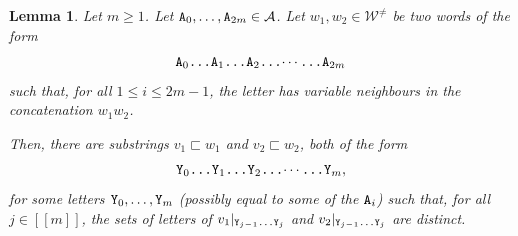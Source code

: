 \documentclass[11pt]{amsart}
\newtheorem{lemma}[theorem]{Lemma}
\theoremstyle{definition}
\renewcommand{\leq}{\leqslant}
\renewcommand{\geq}{\geqslant}
\newcommand{\sinterval}[1]{[\![#1]\!] }
\newcommand{\upletters}[1]{{\normalfont{\texttt{#1}}}}
\newcommand{\makesubscript}[1]{\textsubscript{$#1$}}
\newcommand{\word}{\mathcal{W}}
\begin{document}
\begin{lemma}
\label{lem:unpredstep2}
Let $m\geq 1$. Let $\upletters{A\makesubscript{0}}, \ldots, \upletters{A\makesubscript{2m}}\in \mathcal{A}$. Let $w_1,w_2\in \word^{\neq}$ be two words of the form
\begin{equation*}
\upletters{A\makesubscript{0}\ldots A\makesubscript{1}\ldots A\makesubscript{2}\ldots$\cdots$\ldots A\makesubscript{2m}}
\end{equation*}
such that, for all $1\leq i\leq 2m-1$, the letter \upletters{A\makesubscript{i}} has variable neighbours in the concatenation $w_1w_2$. 

Then, there are substrings $v_1 \sqsubset w_1$ and $v_2 \sqsubset w_2$, both of the form
\begin{equation*}
\upletters{Y\makesubscript{0}\ldots Y\makesubscript{1}\ldots Y\makesubscript{2}\ldots$\cdots$\ldots Y\makesubscript{m}},
\end{equation*}
for some letters $\upletters{Y\makesubscript{0}},\ldots,\upletters{Y\makesubscript{m}}$ (possibly equal to some of the $\upletters{A\makesubscript{i}}$) such that, for all $j\in \sinterval{m}$, the sets of letters of $v_1|_{\upletters{Y\makesubscript{j\!-\!1}\ldots Y\makesubscript{j}}}$ and $v_2|_{\upletters{Y\makesubscript{j\!-\!1}\ldots Y\makesubscript{j}}}$ are distinct.
\end{lemma}
\end{document}
